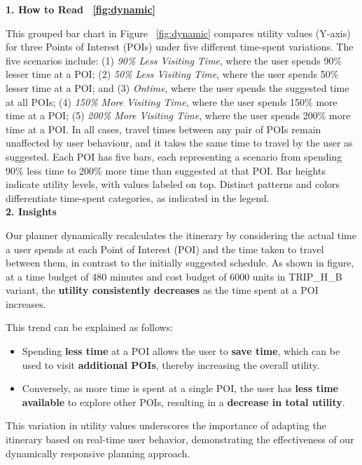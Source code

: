 \noindent\textbf{1. How to Read ~\ref{fig:dynamic}}

This grouped bar chart in Figure ~\ref{fig:dynamic} compares utility values (Y-axis) for three Points of Interest (POIs) under five different time-spent variations. The five scenarios include: (1) \textit{90\% Less Visiting Time}, where the user spends 90\% lesser time at a POI; (2) \textit{50\% Less Visiting Time}, where the user spends 50\% lesser time at a POI; and (3) \textit{Ontime}, where the user spends the suggested time at all POIs; (4) \textit{150\% More Visiting Time}, where the user spends 150\% more time at a POI; (5) \textit{200\% More Visiting Time}, where the user spends 200\% more time at a POI. 
In all cases, travel times between any pair of POIs remain unaffected by user behaviour, and it takes the same time to travel by the user as suggested. Each POI has five bars, each representing a scenario from spending 90\% less time to 200\% more time than suggested at that POI. Bar heights indicate utility levels, with values labeled on top. Distinct patterns and colors differentiate time-spent categories, as indicated in the legend.\\

\noindent\textbf{2. Insights}

Our planner dynamically recalculates the itinerary by considering the actual time a user spends at each Point of Interest (POI) and the time taken to travel between them, in contrast to the initially suggested schedule.  As shown in figure, at a time budget of 480 minutes and cost budget of 6000 units in TRIP\_H\_B variant, the \textbf{utility consistently decreases} as the time spent at a POI increases.

This trend can be explained as follows:

\begin{itemize}
    \item Spending \textbf{less time} at a POI allows the user to \textbf{save time}, which can be used to visit \textbf{additional POIs}, thereby increasing the overall utility.
    \item Conversely, as more time is spent at a single POI, the user has \textbf{less time available} to explore other POIs, resulting in a \textbf{decrease in total utility}.
\end{itemize}

\noindent This variation in utility values underscores the importance of adapting the itinerary based on real-time user behavior, demonstrating the effectiveness of our dynamically responsive planning approach.\\
 
